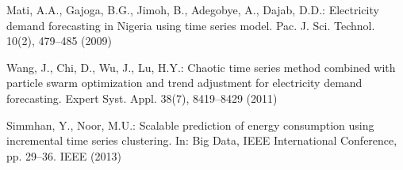 \documentclass[lettersize,journal]{IEEEtran}
\begin{document}
\begin{thebibliography}{1}
  Mati, A.A., Gajoga, B.G., Jimoh, B., Adegobye, A., Dajab, D.D.: Electricity demand forecasting in Nigeria using time series model. Pac. J. Sci. Technol. 10(2), 479–485 (2009)

  Wang, J., Chi, D., Wu, J., Lu, H.Y.: Chaotic time series method combined with particle swarm optimization and trend adjustment for electricity demand forecasting. Expert Syst. Appl. 38(7), 8419–8429 (2011)

  Simmhan, Y., Noor, M.U.: Scalable prediction of energy consumption using incremental time series clustering. In: Big Data, IEEE International Conference, pp. 29–36. IEEE (2013)
\end{thebibliography}
\end{document}
